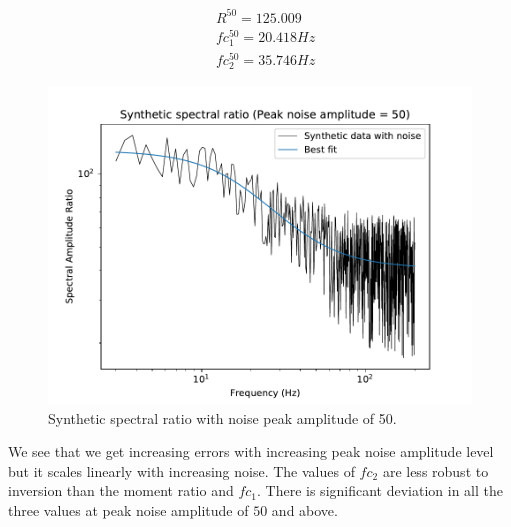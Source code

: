 \documentclass[11pt]{article}
\begin{document}
\begin{align*}
    &R^{50} = 125.009 \\
    &fc_1^{50} = 20.418 Hz \\
    &fc_2^{50} = 35.746 Hz
\end{align*}
\begin{figure}[!htb]
    \centering
    \includegraphics[scale=0.7]{fig_noise_5.pdf}
    \caption{Synthetic spectral ratio with noise peak amplitude of 50.}
\end{figure}

We see that we get increasing errors with increasing peak noise amplitude level but it scales linearly with increasing noise. The values of $fc_2$ are less robust to inversion than the moment ratio and $fc_1$. There is significant deviation in all the three values at peak noise amplitude of $50$ and above. 

\clearpage
\end{document}
